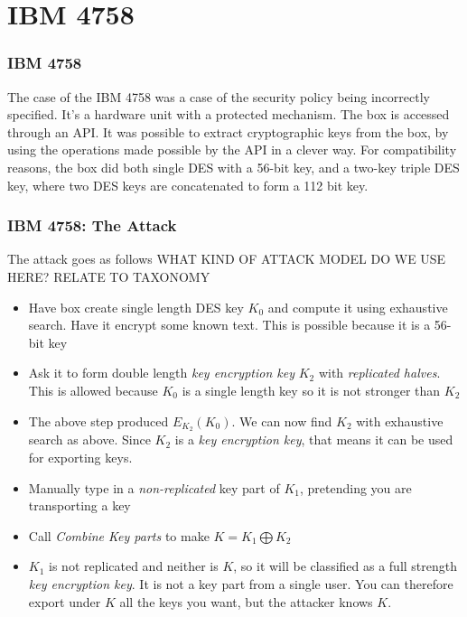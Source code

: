 \documentclass[14pt]{beamer}
\begin{document}
\section{IBM 4758}
        \begin{frame}
            \frametitle{IBM 4758}
                The case of the IBM 4758 was a case of the security policy being incorrectly specified. 
                It's a hardware unit with a protected mechanism. The box is accessed through an API. It was possible to extract cryptographic keys from the box, by using the operations made possible by the API in a clever way. For compatibility reasons, the box did both single DES with a 56-bit key, and a two-key triple DES key, where two DES keys are concatenated to form a 112 bit key. 
        \end{frame}
        \begin{frame}
            \frametitle{IBM 4758: The Attack}
                The attack goes as follows
                WHAT KIND OF ATTACK MODEL DO WE USE HERE? RELATE TO TAXONOMY
                \begin{itemize}
                    \item Have box create single length DES key $K_0$ and compute it using exhaustive search. Have it encrypt some known text. This is possible because it is a 56-bit key
                    \item Ask it to form double length \textit{key encryption key} $K_2$ with \textit{replicated halves}. This is allowed because $K_0$ is a single length key so it is not stronger than $K_2$
                    \item The above step produced $E_{K_2}(K_0)$. We can now find $K_2$ with exhaustive search as above. Since $K_2$ is a \textit{key encryption key}, that means it can be used for exporting keys. 
                    \item Manually type in a \textit{non-replicated} key part of $K_1$, pretending you are transporting a key
                    \item Call \textit{Combine Key parts} to make $K = K_1 \bigoplus K_2$
                    \item $K_1$ is not replicated and neither is $K$, so it will be classified as a full strength \textit{key encryption key}. It is not a key part from a single user. You can therefore export under $K$ all the keys you want, but the attacker knows $K$.
                \end{itemize}
        \end{frame}
\end{document}
